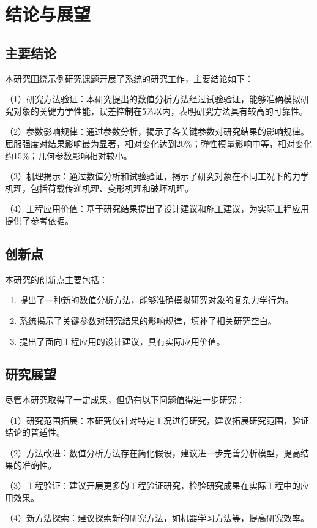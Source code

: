\chapter{结论与展望}
\section{主要结论}
本研究围绕示例研究课题开展了系统的研究工作，主要结论如下：

（1）研究方法验证：本研究提出的数值分析方法经过试验验证，能够准确模拟研究对象的关键力学性能，误差控制在5\%以内，表明研究方法具有较高的可靠性。

（2）参数影响规律：通过参数分析，揭示了各关键参数对研究结果的影响规律。屈服强度对结果影响最为显著，相对变化达到20\%；弹性模量影响中等，相对变化约15\%；几何参数影响相对较小。

（3）机理揭示：通过数值分析和试验验证，揭示了研究对象在不同工况下的力学机理，包括荷载传递机理、变形机理和破坏机理。

（4）工程应用价值：基于研究结果提出了设计建议和施工建议，为实际工程应用提供了参考依据。

\section{创新点}
本研究的创新点主要包括：
\begin{enumerate}
    \item 提出了一种新的数值分析方法，能够准确模拟研究对象的复杂力学行为。
    \item 系统揭示了关键参数对研究结果的影响规律，填补了相关研究空白。
    \item 提出了面向工程应用的设计建议，具有实际应用价值。
\end{enumerate}

\section{研究展望}
尽管本研究取得了一定成果，但仍有以下问题值得进一步研究：

（1）研究范围拓展：本研究仅针对特定工况进行研究，建议拓展研究范围，验证结论的普适性。

（2）方法改进：数值分析方法存在简化假设，建议进一步完善分析模型，提高结果的准确性。

（3）工程验证：建议开展更多的工程验证研究，检验研究成果在实际工程中的应用效果。

（4）新方法探索：建议探索新的研究方法，如机器学习方法等，提高研究效率。